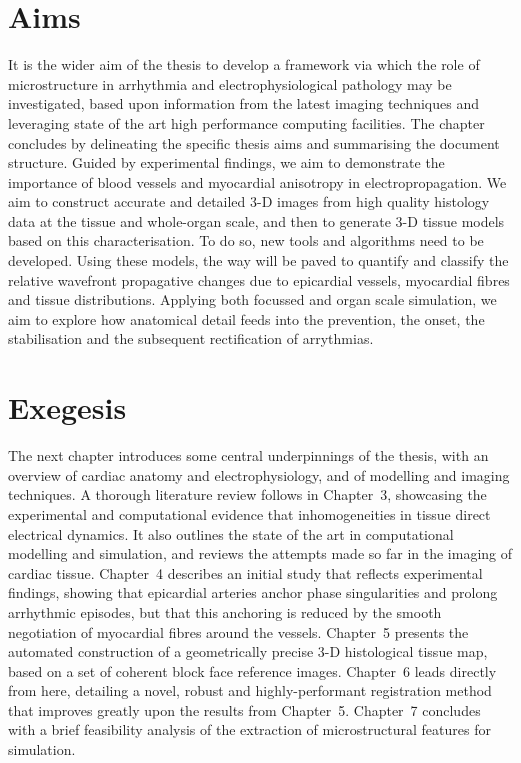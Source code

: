 \section{Aims}
\label{sec:intro:aims}
It is the wider aim of the thesis to develop a framework via which the role of microstructure in arrhythmia and electrophysiological pathology may be investigated, based upon information from the latest imaging techniques and leveraging state of the art high performance computing facilities. The chapter concludes by delineating the specific thesis aims and summarising the document structure. Guided by experimental findings, we aim to demonstrate the importance of blood vessels and myocardial anisotropy in electropropagation. We aim to construct accurate and detailed 3-D images from high quality histology data at the tissue and whole-organ scale, and then to generate 3-D tissue models based on this characterisation. To do so, new tools and algorithms need to be developed. Using these models, the way will be paved to quantify and classify the relative wavefront propagative changes due to epicardial vessels, myocardial fibres and tissue distributions. Applying both focussed and organ scale simulation, we aim to explore how anatomical detail feeds into the prevention, the onset, the stabilisation and the subsequent rectification of arrythmias.

\section{Exegesis}
\label{sec:intro:exegesis}
  The next chapter introduces some central underpinnings of the thesis, with an overview of cardiac anatomy and electrophysiology, and of modelling and imaging techniques. A thorough literature review follows in Chapter~3, showcasing the experimental and computational evidence that inhomogeneities in tissue direct electrical dynamics. It also outlines the state of the art in computational modelling and simulation, and reviews the attempts made so far in the imaging of cardiac tissue. Chapter~4 describes an initial study that reflects experimental findings, showing that epicardial arteries anchor phase singularities and prolong arrhythmic episodes, but that this anchoring is reduced by the smooth negotiation of myocardial fibres around the vessels. Chapter~5 presents the automated construction of a geometrically precise 3-D histological tissue map, based on a set of coherent block face reference images. Chapter~6 leads directly from here, detailing a novel, robust and highly-performant registration method that improves greatly upon the results from Chapter~5. Chapter~7 concludes with a brief feasibility analysis of the extraction of microstructural features for simulation.

